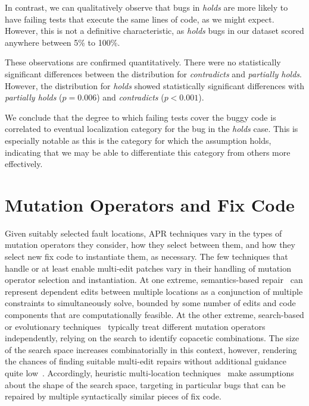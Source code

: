 \documentclass[10pt, conference]{IEEEtran}
\begin{document}
In contrast, we can qualitatively observe that bugs in \emph{holds} are more likely to have 
failing tests that execute the same lines of code, as we might expect. However, this is not a 
definitive characteristic, as \emph{holds} bugs in our dataset scored anywhere between 
5\% to 100\%.

These observations are confirmed quantitatively. There were no statistically significant 
differences between the distribution for \emph{contradicts} and \emph{partially holds}. 
However, the distribution for \emph{holds} showed statistically significant differences with 
\emph{partially holds} ($p = 0.006$)  and \emph{contradicts} ($p < 0.001$).

We conclude that the degree to which failing tests cover the buggy 
code is correlated to eventual localization category for the bug in the \emph{holds} case. 
This is especially notable as this is the category for which the assumption holds, indicating that 
we may be able to differentiate this category from others more effectively.

\section{Mutation Operators and Fix Code}
\label{sec:mutops}

Given suitably selected fault locations, APR techniques vary in the types of
mutation operators they consider, how they select between them, and how they
select new fix code to instantiate them, as necessary. 
%
The few techniques that handle or at least enable multi-edit patches vary in their
handling of mutation operator selection and instantiation.  At one
extreme, semantics-based repair~\cite{s3,angelix} can represent dependent edits between multiple
locations as a conjunction of multiple constraints to simultaneously solve,
bounded by some number of edits and code components that are computationally feasible. 
At the other extreme, search-based or
evolutionary techniques~\cite{genprog,par} typically treat different mutation
operators independently, relying on the search to 
identify copacetic combinations.  The size of
the search space increases combinatorially in this context, however, rendering
the chances of finding suitable multi-edit repairs without additional guidance
quite low~\cite{ae,long-search-spaces}. Accordingly, heuristic multi-location
techniques~\cite{saha2019harnessing} make assumptions about the 
shape of the search space, 
targeting in particular bugs that can be repaired by multiple syntactically similar pieces of
fix code.
\end{document}
